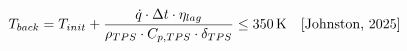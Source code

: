 \documentclass[preview]{standalone}
\begin{document}
\begin{align*}
\special{dvisvgm:raw <g id='unique000'>}T_{back} = T_{init} + \frac{\dot{q} \cdot \Delta t \cdot \eta_{lag}}{\rho_{TPS} \cdot C_{p,TPS} \cdot \delta_{TPS}} \le 350\,\text{K} \quad \text{[Johnston, 2025]}\special{dvisvgm:raw </g>}
\end{align*}
\end{document}
